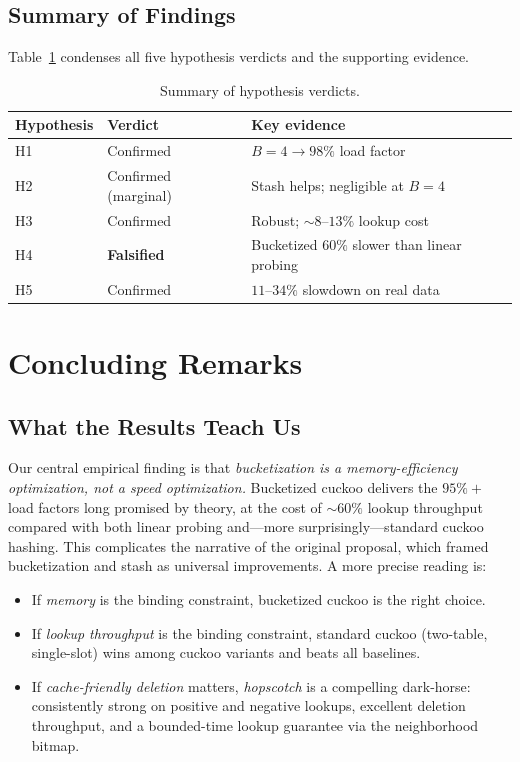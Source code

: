 \documentclass[10pt,journal,compsoc]{IEEEtran}
\begin{document}
\subsection{Summary of Findings}

Table~\ref{tab:summary} condenses all five hypothesis verdicts and the supporting evidence.

\begin{table}[h]
\centering
\caption{Summary of hypothesis verdicts.}
\label{tab:summary}
\small
\begin{tabular}{@{}p{1.2cm}p{2.0cm}p{4.1cm}@{}}
\toprule
Hypothesis & Verdict & Key evidence \\
\midrule
H1 & Confirmed              & $B=4 \rightarrow 98\%$ load factor\\
H2 & Confirmed (marginal)   & Stash helps; negligible at $B=4$\\
H3 & Confirmed              & Robust; $\sim 8$--$13\%$ lookup cost\\
H4 & \textbf{Falsified}     & Bucketized $60\%$ slower than linear probing\\
H5 & Confirmed              & $11$--$34\%$ slowdown on real data\\
\bottomrule
\end{tabular}
\end{table}

\section{Concluding Remarks}\label{sec:conclusion}

\subsection{What the Results Teach Us}
Our central empirical finding is that \emph{bucketization is a memory-efficiency optimization, not a speed optimization.} Bucketized cuckoo delivers the $95\%+$ load factors long promised by theory, at the cost of $\sim 60\%$ lookup throughput compared with both linear probing and---more surprisingly---standard cuckoo hashing. This complicates the narrative of the original proposal, which framed bucketization and stash as universal improvements. A more precise reading is:

\begin{itemize}
    \item If \emph{memory} is the binding constraint, bucketized cuckoo is the right choice.
    \item If \emph{lookup throughput} is the binding constraint, standard cuckoo (two-table, single-slot) wins among cuckoo variants and beats all baselines.
    \item If \emph{cache-friendly deletion} matters, \emph{hopscotch} is a compelling dark-horse: consistently strong on positive and negative lookups, excellent deletion throughput, and a bounded-time lookup guarantee via the neighborhood bitmap.
\end{itemize}
\end{document}
